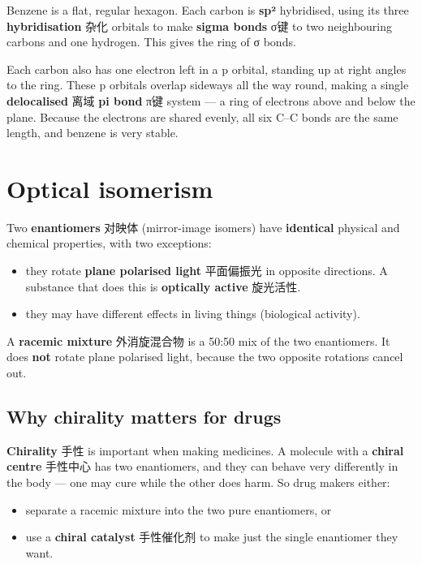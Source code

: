 \documentclass[11pt]{article}
\begin{document}
Benzene is a flat, regular hexagon. Each carbon is \textbf{sp²} hybridised, using its three \textbf{hybridisation} 杂化 orbitals to make \textbf{sigma bonds} σ键 to two neighbouring carbons and one hydrogen. This gives the ring of σ bonds.

Each carbon also has one electron left in a p orbital, standing up at right angles to the ring. These p orbitals overlap sideways all the way round, making a single \textbf{delocalised} 离域 \textbf{pi bond} π键 system — a ring of electrons above and below the plane. Because the electrons are shared evenly, all six C–C bonds are the same length, and benzene is very stable.

\section*{Optical isomerism}

Two \textbf{enantiomers} 对映体 (mirror-image isomers) have \textbf{identical} physical and chemical properties, with two exceptions:

\begin{itemize}
\item they rotate \textbf{plane polarised light} 平面偏振光 in opposite directions. A substance that does this is \textbf{optically active} 旋光活性.

\item they may have different effects in living things (biological activity).

\end{itemize}

A \textbf{racemic mixture} 外消旋混合物 is a 50:50 mix of the two enantiomers. It does \textbf{not} rotate plane polarised light, because the two opposite rotations cancel out.

\subsection*{Why chirality matters for drugs}

\textbf{Chirality} 手性 is important when making medicines. A molecule with a \textbf{chiral centre} 手性中心 has two enantiomers, and they can behave very differently in the body — one may cure while the other does harm. So drug makers either:

\begin{itemize}
\item separate a racemic mixture into the two pure enantiomers, or

\item use a \textbf{chiral catalyst} 手性催化剂 to make just the single enantiomer they want.

\end{itemize}
\end{document}
